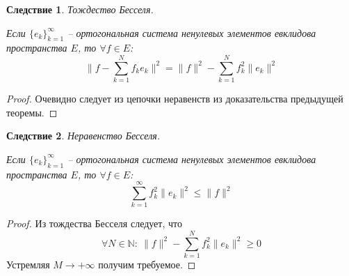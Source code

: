 \documentclass[a4paper,12pt]{article}
\renewcommand{\leq}{\ensuremath{\leqslant}}
\renewcommand{\geq}{\ensuremath{\geqslant}}
\theoremstyle{plain}
\newtheorem*{corollary}{Следствие}
\theoremstyle{definition}
\theoremstyle{remark}
\begin{document}
\begin{corollary}
	Тождество Бесселя.

	Если $\{e_k\}_{k = 1}^\infty$ -- ортогональная система ненулевых элементов евклидова пространства $E$, то $\forall f \in E$:
	\[\|f - \sum_{k = 1}^N f_ke_k\|^2 = \|f\|^2 - \sum_{k = 1}^Nf_k^2\|e_k\|^2\]
\end{corollary}
\begin{proof}
	Очевидно следует из цепочки неравенств из доказательства предыдущей теоремы.
\end{proof}

\begin{corollary}
	Неравенство Бесселя.

	Если $\{e_k\}_{k = 1}^\infty$ -- ортогональная система ненулевых элементов евклидова пространства $E$, то $\forall f \in E$:
	\[\sum_{k = 1}^\infty f_k^2 \|e_k\|^2 \leq \|f\|^2\]
\end{corollary}
\begin{proof}
	Из тождества Бесселя следует, что 
	\[\forall N \in \mathbb{N}:\: \|f\|^2 - \sum_{k = 1}^Nf_k^2\|e_k\|^2 \geq 0\]
	Устремляя $M \to +\infty$ получим требуемое.
\end{proof}
\end{document}
